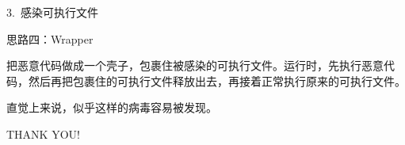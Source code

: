 \documentclass{beamer}
\begin{document}
\begin{frame}{3.\ 感染可执行文件}
  \begin{block}{思路四：Wrapper}

  把恶意代码做成一个壳子，包裹住被感染的可执行文件。运行时，先执行恶意代码，然后再把包裹住的可执行文件释放出去，再接着正常执行原来的可执行文件。

  \pause\vspace{0.6em}

  直觉上来说，似乎这样的病毒容易被发现。

  \end{block}
\end{frame}

\begin{frame}
  \Huge{\centerline{THANK YOU!}}
\end{frame}
\end{document}
